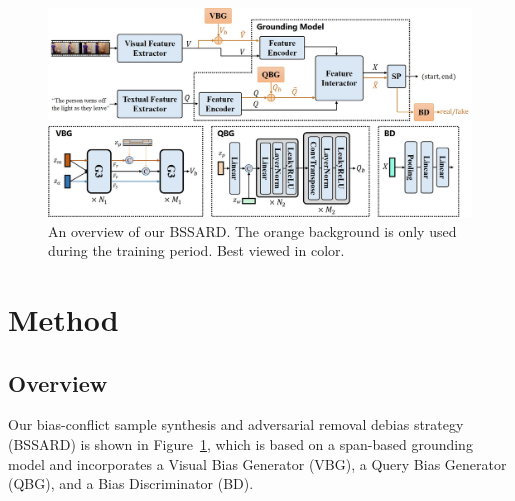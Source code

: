 
\begin{figure}[t]
	\centering
	\includegraphics[width=0.96\linewidth]{images/OverView.jpg}%
	\caption{An overview of our BSSARD. The orange background is only used during the training period. Best viewed in color.}
	\label{Overview}
\end{figure}


\section{Method}


\subsection{Overview}

Our bias-conflict sample synthesis and adversarial removal debias strategy (BSSARD) is shown in Figure~\ref{Overview}, which is based on a span-based grounding model and incorporates a Visual Bias Generator (VBG), a Query Bias Generator (QBG), and a Bias Discriminator (BD). 

